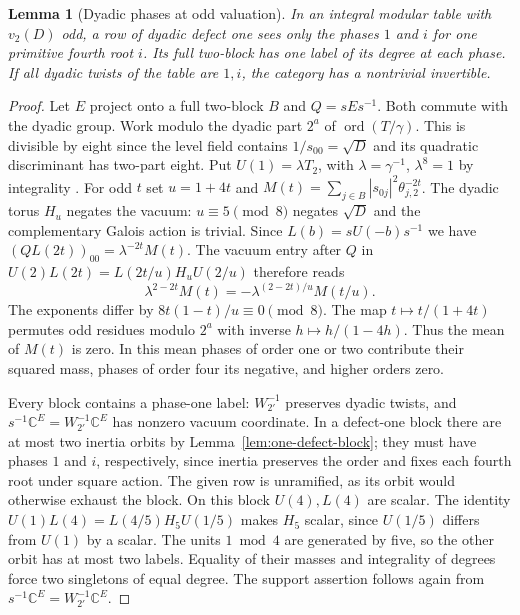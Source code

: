\documentclass[11pt,a4paper]{article}
\numberwithin{equation}{section}
\newtheorem{lemma}[theorem]{Lemma}
\theoremstyle{remark}
\newcommand{\CC}{\mathbb C}
\DeclareMathOperator{\ord}{ord}
\begin{document}
\begin{lemma}[Dyadic phases at odd valuation]\label{seq:two-phase}
In an integral modular table with $v_2(D)$ odd, a row of dyadic
defect one sees only the phases $1$ and $i$ for one primitive
fourth root $i$. Its full two-block has one label of its degree
at each phase. If all dyadic twists of the table are $1,i$, the
category has a nontrivial invertible.
\end{lemma}
\begin{proof}
Let $E$ project onto a full two-block $B$ and $Q=sEs^{-1}$.
Both commute with the dyadic group. Work modulo the dyadic part $2^a$
of $\ord(T/\gamma)$. This is divisible by eight since the level field
contains $1/s_{00}=\sqrt D$ and its quadratic discriminant has
two-part eight. Put $U(1)=\lambda T_2$, with $\lambda=\gamma^{-1}$,
$\lambda^8=1$ by integrality \cite[Proposition~6.7(ii)]{DLNCongruence}.
For odd $t$ set $u=1+4t$ and $M(t)=\sum_{j\in B}|s_{0j}|^2
\theta_{j,2}^{-2t}$. The dyadic torus $H_u$ negates the vacuum:
$u\equiv5\pmod8$ negates $\sqrt D$ and the complementary Galois
action is trivial. Since $L(b)=sU(-b)s^{-1}$ we have
$(QL(2t))_{00}=\lambda^{-2t}M(t)$. The vacuum entry after $Q$ in
$U(2)L(2t)=L(2t/u)H_uU(2/u)$ therefore reads
\[
       \lambda^{2-2t}M(t)=-\lambda^{(2-2t)/u}M(t/u).
\]
The exponents differ by $8t(1-t)/u\equiv0\pmod8$.
The map $t\mapsto t/(1+4t)$ permutes odd residues modulo $2^a$
with inverse $h\mapsto h/(1-4h)$. Thus the mean of $M(t)$ is
zero. In this mean phases of order one or two contribute their
squared mass, phases of order four its negative, and higher
orders zero.

Every block contains a phase-one label: $W_{2'}^{-1}$ preserves
dyadic twists, and $s^{-1}\CC^E=W_{2'}^{-1}\CC^E$ has
nonzero vacuum coordinate. In a defect-one block there are at most
two inertia orbits by Lemma~\ref{lem:one-defect-block};
they must have phases $1$ and $i$, respectively, since inertia
preserves the order and fixes each fourth root under square action.
The given row is unramified, as its orbit would otherwise exhaust
the block. On this block $U(4),L(4)$ are scalar. The identity
$U(1)L(4)=L(4/5)H_5U(1/5)$ makes $H_5$ scalar, since
$U(1/5)$ differs from $U(1)$ by a scalar. The units $1\bmod4$
are generated by five, so the other orbit has at most two labels.
Equality of their masses and integrality of degrees force two
singletons of equal degree. The support assertion follows again
from $s^{-1}\CC^E=W_{2'}^{-1}\CC^E$.


\end{proof}
\end{document}
